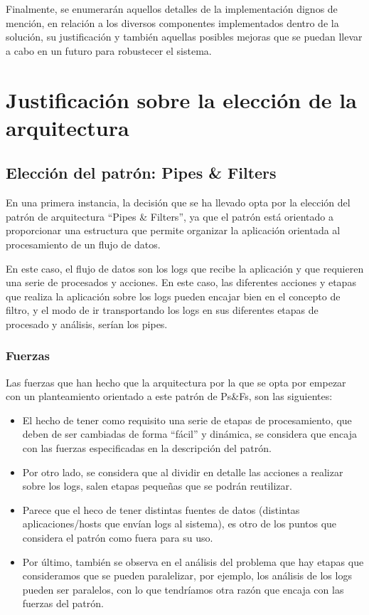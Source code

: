 \documentclass[11pt]{article}
\begin{document}
Finalmente, se enumerarán aquellos detalles de la implementación dignos de mención, en relación a los diversos componentes implementados dentro de la solución, su justificación y también aquellas posibles mejoras que se puedan llevar a cabo en un futuro para robustecer el sistema.

\pagebreak

\section{Justificación sobre la elección de la arquitectura}

\subsection{Elección del patrón: Pipes \& Filters}
En una primera instancia, la decisión que se ha llevado opta por la elección del patrón de arquitectura “Pipes \& Filters”, ya que el patrón está orientado a proporcionar una estructura que permite organizar la aplicación orientada al procesamiento de un flujo de datos.

En este caso, el flujo de datos son los logs que recibe la aplicación y que requieren una serie de procesados y acciones. En este caso, las diferentes acciones y etapas que realiza la aplicación sobre los logs pueden encajar bien en el concepto de filtro, y el modo de ir transportando los logs en sus diferentes etapas de procesado y análisis, serían los pipes.

\subsubsection{Fuerzas}

Las fuerzas que han hecho que la arquitectura por la que se opta por empezar con un planteamiento orientado a este patrón de Ps\&Fs, son las siguientes:

\begin{itemize}
\item{El hecho de tener como requisito una serie de etapas de procesamiento, que deben de ser cambiadas de forma “fácil” y dinámica, se considera que encaja con las fuerzas especificadas en la descripción del patrón.}
\item{Por otro lado, se considera que al dividir en detalle las acciones a realizar sobre los logs, salen etapas pequeñas que se podrán reutilizar.}
\item{Parece que el heco de tener distintas fuentes de datos (distintas aplicaciones/hosts que envían logs al sistema), es otro de los puntos que considera el patrón como fuera para su uso.}
\item{Por último, también se observa en el análisis del problema que hay etapas que consideramos que se pueden paralelizar, por ejemplo, los análisis de los logs pueden ser paralelos, con lo que tendríamos otra razón que encaja con las fuerzas del patrón.}
\end{itemize}
\end{document}

